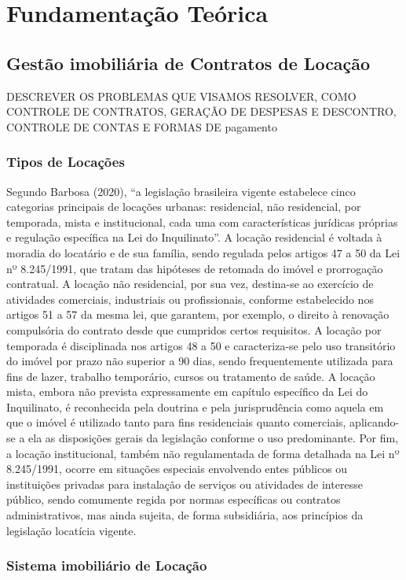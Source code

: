 \documentclass[../main.tex]{subfiles}
\begin{document}
\section{Fundamentação Teórica}    
\subsection{Gestão imobiliária de Contratos de Locação}
DESCREVER OS PROBLEMAS QUE VISAMOS RESOLVER, COMO CONTROLE DE CONTRATOS, GERAÇÃO DE DESPESAS E DESCONTRO, CONTROLE DE CONTAS E FORMAS DE pagamento
\subsubsection{Tipos de Locações}
Segundo Barbosa (2020), “a legislação brasileira vigente estabelece cinco categorias principais de locações urbanas: residencial, não residencial, 
por temporada, mista e institucional, cada uma com características jurídicas próprias e regulação específica na Lei do Inquilinato”. A locação residencial é 
voltada à moradia do locatário e de sua família, sendo regulada pelos artigos 47 a 50 da Lei nº 8.245/1991, que tratam das hipóteses de retomada do imóvel e prorrogação contratual. 
A locação não residencial, por sua vez, destina-se ao exercício de atividades comerciais, industriais ou profissionais, conforme estabelecido nos artigos 51 a 57 da mesma lei, 
que garantem, por exemplo, o direito à renovação compulsória do contrato desde que cumpridos certos requisitos. A locação por temporada é disciplinada nos artigos 48 a 50 e 
caracteriza-se pelo uso transitório do imóvel por prazo não superior a 90 dias, sendo frequentemente utilizada para fins de lazer, trabalho temporário, cursos ou tratamento de saúde. 
A locação mista, embora não prevista expressamente em capítulo específico da Lei do Inquilinato, é reconhecida pela doutrina e pela jurisprudência como aquela em que o imóvel é utilizado 
tanto para fins residenciais quanto comerciais, aplicando-se a ela as disposições gerais da legislação conforme o uso predominante. Por fim, a locação institucional, também não regulamentada de 
forma detalhada na Lei nº 8.245/1991, ocorre em situações especiais envolvendo entes públicos ou instituições privadas para instalação de serviços ou atividades de interesse público, sendo comumente 
regida por normas específicas ou contratos administrativos, mas ainda sujeita, de forma subsidiária, aos princípios da legislação locatícia vigente.
\subsubsection{Sistema imobiliário de Locação}
\end{document}
